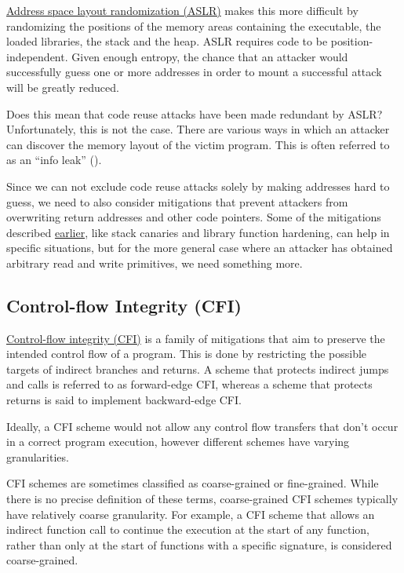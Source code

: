 \documentclass[
  a4paper,
]{report}
\begin{document}
\href{https://en.wikipedia.org/wiki/Address_space_layout_randomization}{Address
space layout randomization (ASLR)} makes this more difficult
by randomizing the positions of the memory areas containing the
executable, the loaded libraries, the stack and the heap. ASLR requires
code to be position-independent. Given enough entropy, the chance that
an attacker would successfully guess one or more addresses in order to
mount a successful attack will be greatly reduced.

Does this mean that code reuse attacks have been made redundant by ASLR?
Unfortunately, this is not the case. There are various ways in which an
attacker can discover the memory layout of the victim program. This is
often referred to as an ``info leak''
().

Since we can not exclude code reuse attacks solely by making addresses
hard to guess, we need to also consider mitigations that prevent
attackers from overwriting return addresses and other code pointers.
Some of the mitigations described
\hyperref[stack-buffer-overflows]{earlier}, like stack canaries and
library function hardening, can help in specific situations, but for the
more general case where an attacker has obtained arbitrary read and
write primitives, we need something more.

\subsection{Control-flow Integrity
(CFI)}\label{control-flow-integrity-cfi}

\href{https://en.wikipedia.org/wiki/Control-flow_integrity}{Control-flow
integrity (CFI)} is a family of mitigations that aim to
preserve the intended control flow of a program. This is done by
restricting the possible targets of indirect branches and returns. A
scheme that protects indirect jumps and calls is referred to as
forward-edge CFI, whereas a scheme that protects
returns is said to implement backward-edge CFI.

Ideally, a CFI scheme would not allow any control flow transfers that
don't occur in a correct program execution, however different schemes
have varying granularities.

CFI schemes are sometimes classified as
coarse-grained or
fine-grained. While there is no precise
definition of these terms, coarse-grained CFI schemes typically have
relatively coarse granularity. For example, a CFI scheme that allows an
indirect function call to continue the execution at the start of any
function, rather than only at the start of functions with a specific
signature, is considered coarse-grained.
\end{document}
